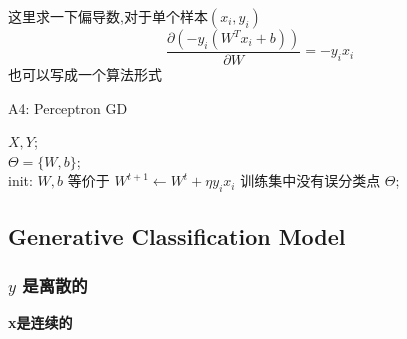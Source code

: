 \documentclass[UTF8]{ctexart}
\begin{document}
这里求一下偏导数,对于单个样本$(x_i, y_i)$
\begin{equation*}
    \frac{\partial (-y_i(W^Tx_i + b))}{\partial W} = -y_i x_i
\end{equation*}
也可以写成一个算法形式

\begin{algorithm}[htb]
    \caption{A4: Perceptron GD}
    \label{alg:A4}
    \begin{algorithmic}[1]
    \REQUIRE
    $X, Y$; \\
    \ENSURE 
    $\Theta=\{W, b\}$; \\
    \STATE init: $W, b$
    \REPEAT 
        \STATE 等价于 $W^{t+1} \leftarrow W^t + \eta y_i x_i$
    \ENDIF
    \UNTIL 训练集中没有误分类点
    \RETURN $\Theta$;
    \end{algorithmic}
\end{algorithm}


\subsection{Generative Classification Model}
\subsubsection*{$y$ 是离散的}

\textbf{x是连续的} 
\end{document}
